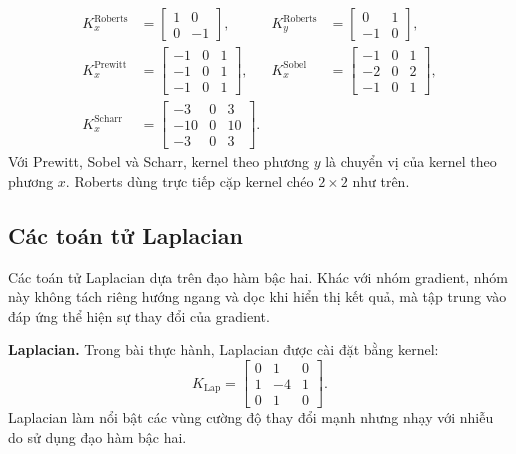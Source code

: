\documentclass[12pt]{article}
\newcommand{\runin}[1]{\par\medskip\noindent\textbf{#1}\hspace{0.4em}\ignorespaces}
\numberwithin{equation}{section}
\begin{document}
\begin{equation}
\begin{aligned}
K_x^{\text{Roberts}} &=
\begin{bmatrix}
1&0\\
0&-1
\end{bmatrix},
&
K_y^{\text{Roberts}} &=
\begin{bmatrix}
0&1\\
-1&0
\end{bmatrix},\\[6pt]
K_x^{\text{Prewitt}} &=
\begin{bmatrix}
-1&0&1\\
-1&0&1\\
-1&0&1
\end{bmatrix},
&
K_x^{\text{Sobel}} &=
\begin{bmatrix}
-1&0&1\\
-2&0&2\\
-1&0&1
\end{bmatrix},\\[6pt]
K_x^{\text{Scharr}} &=
\begin{bmatrix}
-3&0&3\\
-10&0&10\\
-3&0&3
\end{bmatrix}.
\end{aligned}
\end{equation}
Với Prewitt, Sobel và Scharr, kernel theo phương $y$ là chuyển vị của kernel theo phương $x$. Roberts dùng trực tiếp cặp kernel chéo $2\times2$ như trên.

\subsection{Các toán tử Laplacian}

Các toán tử Laplacian dựa trên đạo hàm bậc hai. Khác với nhóm gradient, nhóm này không tách riêng hướng ngang và dọc khi hiển thị kết quả, mà tập trung vào đáp ứng thể hiện sự thay đổi của gradient.

\runin{Laplacian.} Trong bài thực hành, Laplacian được cài đặt bằng kernel:
\begin{equation}
K_{\text{Lap}}=
\begin{bmatrix}
0&1&0\\
1&-4&1\\
0&1&0
\end{bmatrix}.
\label{eq:laplacian-edge-kernel}
\end{equation}
Laplacian làm nổi bật các vùng cường độ thay đổi mạnh nhưng nhạy với nhiễu do sử dụng đạo hàm bậc hai.
\end{document}
